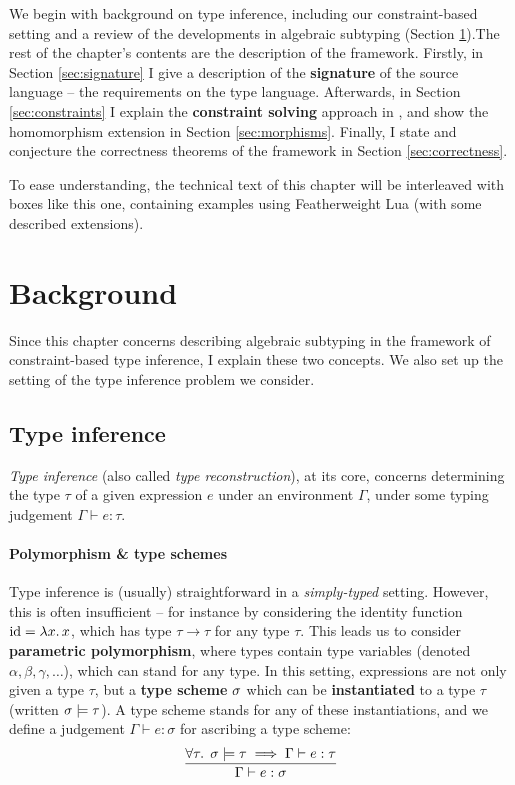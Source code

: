 We begin with background on type inference, including our constraint-based setting and a review of the developments in algebraic subtyping (Section \ref{sec:ch3background}).The rest of the chapter's contents are the description of the framework. Firstly, in Section \ref{sec:signature} I give a description of the \textbf{signature} of the source language -- the requirements on the type language. Afterwards, in Section \ref{sec:constraints} I explain the \textbf{constraint solving} approach in \inference{}, and show the homomorphism extension in Section \ref{sec:morphisms}. Finally, I state and conjecture the correctness theorems of the framework in Section \ref{sec:correctness}. 

\begin{example}
    To ease understanding, the technical text of this chapter will be interleaved with boxes like this one, containing examples using Featherweight Lua (with some described extensions).
\end{example}

\section{Background}
\label{sec:ch3background}

Since this chapter concerns describing algebraic subtyping in the framework of constraint-based type inference, I explain these two concepts. We also set up the setting of the type inference problem we consider. 

\subsection{Type inference}
\emph{Type inference} (also called \emph{type reconstruction}), at its core, concerns determining the type $\tau$ of a given expression $e$ under an environment $\Gamma$, under some typing judgement $\Gamma \vdash e : \tau$.

\paragraph{Polymorphism \& type schemes} Type inference is (usually) straightforward in a \emph{simply-typed} setting. However, this is often insufficient -- for instance by considering the identity function $\mathrm{id} =  \lambda x \ldotp x$, which has type $\tau \to \tau$ for any type $\tau$.
This leads us to consider \textbf{parametric polymorphism}, where types contain type variables (denoted $\alpha, \beta, \gamma, \dots$), which can stand for any type. 
In this setting, expressions are not only given a type $\tau$, but a \textbf{type scheme} $\sigma$ which can be \textbf{instantiated} to a type $\tau$ (written $\sigma \models \tau$). A type scheme stands for any of these instantiations, and we define a judgement $\Gamma \vdash e : \sigma$ for ascribing a type scheme:
$$ \dfrac{\forall \tau \ldotp\; \sigma \models \tau \implies \Gamma \vdash e : \tau}{\Gamma \vdash e : \sigma} $$

